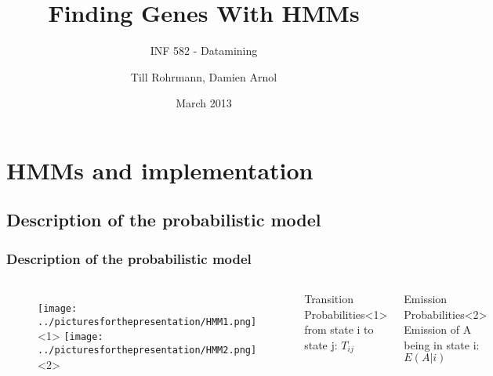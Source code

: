 \documentclass{beamer}
\title{Finding Genes With HMMs}
\subtitle{INF 582 - Datamining}
\author{Till Rohrmann, Damien Arnol}
\date{March 2013}
\begin{document}
\frame{
	\titlepage
}

%
%
%




\section{HMMs and implementation}
\subsection{Description of the probabilistic model}

\begin{frame}
\frametitle{Description of the probabilistic model}
\begin{columns}

		\begin{figure}[h]
			\centering
			\texttt{[image: ../picturesforthepresentation/HMM1.png]}<1>
			\texttt{[image: ../picturesforthepresentation/HMM2.png]}<2>		
		\end{figure}
		
		\begin{block}{Transition Probabilities}<1>
			from state i to state j: $T_{ij}$\\
		
		\end{block}
		\vspace{0.3cm}
		\begin{block}{Emission Probabilities}<2>
			Emission of A being in state i: $E(A|i)$
		\end{block}
\end{columns}
\end{frame}
\end{document}
